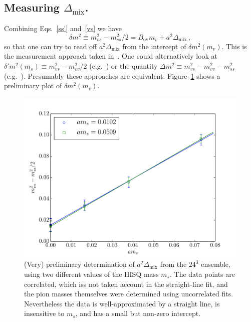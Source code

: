 \documentclass[11pt,a4paper]{article}
\newcommand{\Dmix}[0]{\Delta_{\text{mix}}}
\begin{document}
\subsection{Measuring $\Dmix$.}
Combining Eqs.~\eqref{ss'} and~\eqref{vs} we have
\begin{equation}
\delta m^2 \equiv m^2_{vs} - m^2_{ss}/2 = B_{\text{ov}} m_v + a^2 \Dmix \, ,
\end{equation}
so that one can try to read off $a^2 \Dmix$ from the intercept of $\delta m^2(m_v)$. 
This is the measurement approach taken in~\cite{Lujan:2012wg}.
One could alternatively look at 
$\delta' m^2(m_s)  \equiv m^2_{vs} - m^2_{vv}/2$ (e.g.~\cite{Aubin:2008wk})
or the quantity $\Delta m^2 \equiv m^2_{vs} - m^2_{vv} - m^2_{ss}$ (e.g.~\cite{Orginos:2007tw}).
Presumably these approaches are equivalent.  
Figure~\ref{fig:delta_msq} shows a preliminary plot of $\delta m^2(m_v)$.
\begin{figure}
\centering
\includegraphics[width=\textwidth]{delta_msq.pdf}
\caption{(Very) preliminary determination of $a^2 \Dmix$ from the $24^3$ ensemble, using
two different values of the HISQ mass $m_s$. The data points are correlated, which
iss not taken account in the straight-line fit, and the pion masses themselves were determined
using uncorrelated fits.  Nevertheless the data is well-approximated by a straight line, is
insensitive to $m_s$, and has a small but non-zero intercept.} 
\label{fig:delta_msq}
\end{figure}

 
 \clearpage
\end{document}
